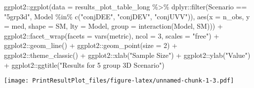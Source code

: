 \documentclass[
]{article}
\newenvironment{Shaded}{\begin{snugshade}}{\end{snugshade}}
\newcommand{\AttributeTok}[1]{\textcolor[rgb]{0.77,0.63,0.00}{#1}}
\newcommand{\DecValTok}[1]{\textcolor[rgb]{0.00,0.00,0.81}{#1}}
\newcommand{\FunctionTok}[1]{\textcolor[rgb]{0.00,0.00,0.00}{#1}}
\newcommand{\NormalTok}[1]{#1}
\newcommand{\SpecialCharTok}[1]{\textcolor[rgb]{0.00,0.00,0.00}{#1}}
\newcommand{\StringTok}[1]{\textcolor[rgb]{0.31,0.60,0.02}{#1}}
\begin{document}
\begin{Shaded}
\begin{Highlighting}[]
\NormalTok{ggplot2}\SpecialCharTok{::}\FunctionTok{ggplot}\NormalTok{(}\AttributeTok{data =}\NormalTok{ results\_plot\_table\_long }\SpecialCharTok{\%\textgreater{}\%} 
\NormalTok{                  dplyr}\SpecialCharTok{::}\FunctionTok{filter}\NormalTok{(Scenario }\SpecialCharTok{==} \StringTok{"5grp3d"}\NormalTok{, Model }\SpecialCharTok{\%in\%} \FunctionTok{c}\NormalTok{(}\StringTok{"conjDEE"}\NormalTok{, }\StringTok{"conjDEV"}\NormalTok{, }\StringTok{"conjUVV"}\NormalTok{)), }
                \FunctionTok{aes}\NormalTok{(}\AttributeTok{x =}\NormalTok{ n\_obs, }\AttributeTok{y =}\NormalTok{ med, }\AttributeTok{shape =}\NormalTok{ SM, }\AttributeTok{lty =}\NormalTok{ Model, }
                    \AttributeTok{group =} \FunctionTok{interaction}\NormalTok{(Model, SM))) }\SpecialCharTok{+}
\NormalTok{  ggplot2}\SpecialCharTok{::}\FunctionTok{facet\_wrap}\NormalTok{(}\AttributeTok{facets =} \FunctionTok{vars}\NormalTok{(metric), }\AttributeTok{ncol =} \DecValTok{3}\NormalTok{, }\AttributeTok{scales =} \StringTok{"free"}\NormalTok{) }\SpecialCharTok{+}
\NormalTok{  ggplot2}\SpecialCharTok{::}\FunctionTok{geom\_line}\NormalTok{() }\SpecialCharTok{+} 
\NormalTok{  ggplot2}\SpecialCharTok{::}\FunctionTok{geom\_point}\NormalTok{(}\AttributeTok{size =} \DecValTok{2}\NormalTok{) }\SpecialCharTok{+}
\NormalTok{  ggplot2}\SpecialCharTok{::}\FunctionTok{theme\_classic}\NormalTok{() }\SpecialCharTok{+}
\NormalTok{  ggplot2}\SpecialCharTok{::}\FunctionTok{xlab}\NormalTok{(}\StringTok{"Sample Size"}\NormalTok{) }\SpecialCharTok{+}
\NormalTok{  ggplot2}\SpecialCharTok{::}\FunctionTok{ylab}\NormalTok{(}\StringTok{"Value"}\NormalTok{) }\SpecialCharTok{+}
\NormalTok{  ggplot2}\SpecialCharTok{::}\FunctionTok{ggtitle}\NormalTok{(}\StringTok{"Results for 5 group 3D Scenario"}\NormalTok{)}
\end{Highlighting}
\end{Shaded}

\texttt{[image: PrintResultPlot\_files/figure-latex/unnamed-chunk-1-3.pdf]}
\end{document}
